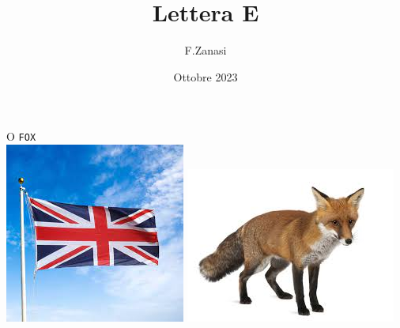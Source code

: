 \documentclass[]{article}
\title{Lettera E}
\author{F.Zanasi}
\date{Ottobre 2023}
\begin{document}
{\fontsize{150}{160}\selectfont O} 
\hspace{2.0in}
{\fontsize{80}{80}\color{black}\texttt{F}\color{blue}\texttt{O}\color{black}\texttt{X}} 
\\[1cm]
\includegraphics[scale=0.3]{flag-UK}
\includegraphics[scale=0.4]{fox}
\end{document}
